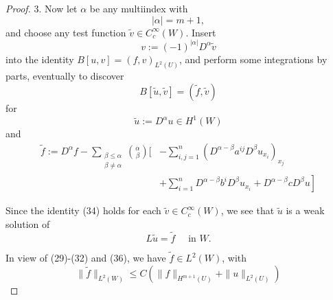 \begin{theorem}
\begin{proof}
        3.
        Now let $\alpha$ be any multiindex with
        \begin{equation*}
            |\alpha|=m+1,
        \end{equation*}
        and choose any test function $\tilde{v} \in C_c^{\infty}(W)$. Insert
        \begin{equation*}
            v:=(-1)^{|\alpha|} D^\alpha \tilde{v}
        \end{equation*}
        into the identity $B[u, v]=(f, v)_{L^2(U)}$, and perform some integrations by parts, eventually to discover
        \begin{equation*}
            B[\tilde{u}, \tilde{v}]=(\tilde{f}, \tilde{v})
        \end{equation*}
        for
        \begin{equation*}
            \tilde{u}:=D^\alpha u \in H^1(W)
        \end{equation*}
        and
        \begin{equation*}
            \begin{aligned}
                \tilde{f}:=D^\alpha f-\sum_{\substack{\beta \leq \alpha                                                                                  \\
                \beta \neq \alpha}}\binom{\alpha}{\beta}[ & -\sum_{i, j=1}^n\left(D^{\alpha-\beta} a^{i j} D^\beta u_{x_i}\right)_{x_j}                  \\
                                                          & \left.+\sum_{i=1}^n D^{\alpha-\beta} b^i D^\beta u_{x_i}+D^{\alpha-\beta} c D^\beta u\right]
            \end{aligned}
        \end{equation*}

        Since the identity (34) holds for each $\tilde{v} \in C_c^{\infty}(W)$, we see that $\tilde{u}$ is a weak solution of
        \begin{equation*}
            L \tilde{u}=\tilde{f} \quad \text { in } W .
        \end{equation*}

        In view of (29)-(32) and (36), we have $\tilde{f} \in L^2(W)$, with
        \begin{equation*}
            \|\tilde{f}\|_{L^2(W)} \leq C\left(\|f\|_{H^{m+1}(U)}+\|u\|_{L^2(U)}\right)
        \end{equation*}


\end{proof}
\end{theorem}
